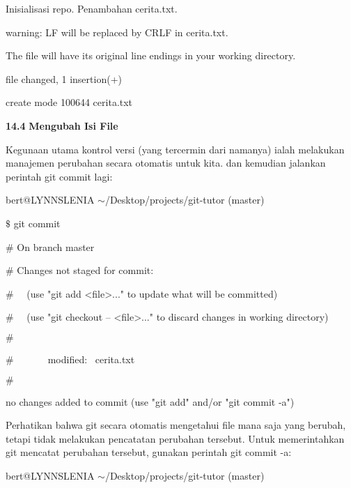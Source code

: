 {\fontsize{10pt}{10pt} Inisialisasi repo. Penambahan cerita.txt.} \par
{\fontsize{10pt}{10pt}\selectfont warning: LF will be replaced by CRLF in cerita.txt.} \par
{\fontsize{10pt}{10pt}\selectfont The file will have its original line endings in your working directory.} \par
{\fontsize{10pt}{10pt} file changed, 1 insertion(+)} \par
{\fontsize{10pt}{10pt}\selectfont  create mode 100644 cerita.txt} \par
\noindent 
\vspace{12pt}
\noindent 
\textbf{14.4}\textbf{ Mengubah Isi File} \par
Kegunaan utama kontrol versi (yang tercermin dari namanya) ialah melakukan manajemen perubahan secara otomatis untuk kita. dan kemudian jalankan perintah git commit lagi: \par
{\fontsize{10pt}{10pt}\selectfont bert@LYNNSLENIA  $  \sim  $/Desktop/projects/git-tutor (master)} \par
{\fontsize{10pt}{10pt}\selectfont  $  \$  $ git commit} \par
{\fontsize{10pt}{10pt}\selectfont  $  \#  $ On branch master} \par
{\fontsize{10pt}{10pt}\selectfont  $  \#  $ Changes not staged for commit:} \par
{\fontsize{10pt}{10pt}\selectfont  $  \#  $~~ (use "git add <file>..." to update what will be committed)} \par
{\fontsize{10pt}{10pt}\selectfont  $  \#  $~~ (use "git checkout -- <file>..." to discard changes in working directory)} \par
{\fontsize{10pt}{10pt}\selectfont  $  \#  $} \par
{\fontsize{10pt}{10pt}\selectfont  $  \#  $~~~~~~~modified:~  cerita.txt} \par
{\fontsize{10pt}{10pt}\selectfont  $  \#  $} \par
{\fontsize{10pt}{10pt}\selectfont no changes added to commit (use "git add" and/or "git commit -a")} \par
\vspace{12pt}
Perhatikan bahwa git secara otomatis mengetahui file mana saja yang berubah, tetapi tidak melakukan pencatatan perubahan tersebut. Untuk memerintahkan git mencatat perubahan tersebut, gunakan perintah git commit -a: \par
{\fontsize{10pt}{10pt}\selectfont bert@LYNNSLENIA  $  \sim  $/Desktop/projects/git-tutor (master)} \par
